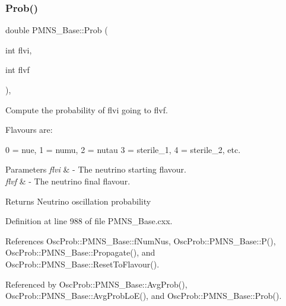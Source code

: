 \subsubsection{\texorpdfstring{Prob()}{Prob()}\hspace{0.1cm}{\footnotesize\ttfamily [1/3]}}
{\footnotesize\ttfamily double P\+M\+N\+S\+\_\+\+Base\+::\+Prob (\begin{DoxyParamCaption}\item[{int}]{flvi,  }\item[{int}]{flvf }\end{DoxyParamCaption})\hspace{0.3cm}{\ttfamily [virtual]}, {\ttfamily [inherited]}}

Compute the probability of flvi going to flvf.

Flavours are\+: 
\begin{DoxyPre}
  0 = nue, 1 = numu, 2 = nutau
  3 = sterile\_1, 4 = sterile\_2, etc.
\end{DoxyPre}
 
\begin{DoxyParams}{Parameters}
{\em flvi} & -\/ The neutrino starting flavour. \\
\hline
{\em flvf} & -\/ The neutrino final flavour.\\
\hline
\end{DoxyParams}
\begin{DoxyReturn}{Returns}
Neutrino oscillation probability 
\end{DoxyReturn}


Definition at line 988 of file P\+M\+N\+S\+\_\+\+Base.\+cxx.



References Osc\+Prob\+::\+P\+M\+N\+S\+\_\+\+Base\+::f\+Num\+Nus, Osc\+Prob\+::\+P\+M\+N\+S\+\_\+\+Base\+::\+P(), Osc\+Prob\+::\+P\+M\+N\+S\+\_\+\+Base\+::\+Propagate(), and Osc\+Prob\+::\+P\+M\+N\+S\+\_\+\+Base\+::\+Reset\+To\+Flavour().



Referenced by Osc\+Prob\+::\+P\+M\+N\+S\+\_\+\+Base\+::\+Avg\+Prob(), Osc\+Prob\+::\+P\+M\+N\+S\+\_\+\+Base\+::\+Avg\+Prob\+Lo\+E(), and Osc\+Prob\+::\+P\+M\+N\+S\+\_\+\+Base\+::\+Prob().


